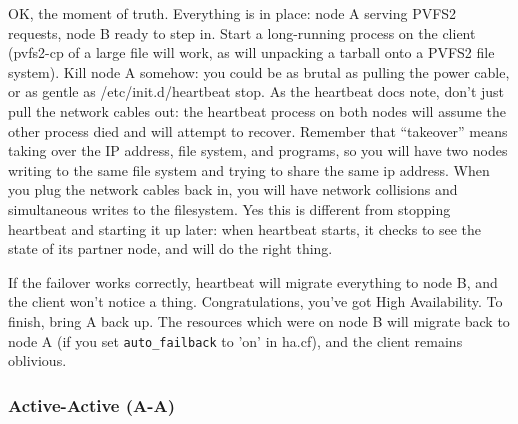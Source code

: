 \documentclass[11pt]{article}
\begin{document}
OK, the moment of truth.  Everything is in place: node A serving PVFS2
requests, node B ready to step in.  Start a long-running process on the
client (pvfs2-cp of a large file will work, as will unpacking a tarball
onto a PVFS2 file system).  Kill node A somehow:  you could be as brutal
as pulling the power cable, or as gentle as /etc/init.d/heartbeat stop.
As the heartbeat docs note, don't just pull the network cables out: the
heartbeat process on both nodes will assume the other process died and
will attempt to recover.  Remember that ``takeover'' means taking over
the IP address, file system, and programs, so you will have two nodes
writing to the same file system and trying to share the same ip address.
When you plug the network cables back in, you will have network
collisions and simultaneous writes to the filesystem.  Yes this is
different from stopping heartbeat and starting it up later: when
heartbeat starts, it checks to see the state of its partner node, and
will do the right thing. 

If the failover works correctly, heartbeat will migrate everything to
node B, and the client won't notice a thing.   Congratulations, you've
got High Availability.  To finish, bring A back up.  The resources which
were on node B will migrate back to node A (if you set
\texttt{auto\_failback} to 'on' in ha.cf), and the client remains
oblivious.

\subsubsection{Active-Active (A-A)}
\end{document}
